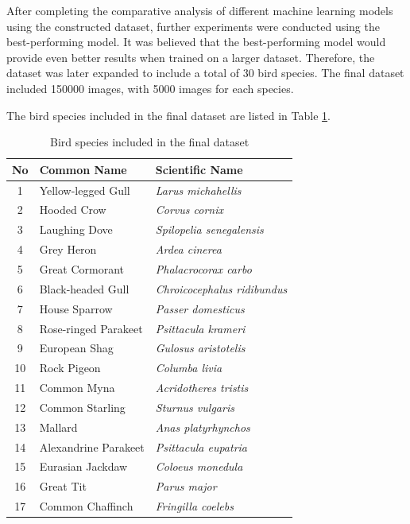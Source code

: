 After completing the comparative analysis of different machine learning models using
the constructed dataset, further experiments were conducted using the best-performing
model. It was believed that the best-performing model would provide even better
results when trained on a larger dataset. Therefore, the dataset was later expanded
to include a total of 30 bird species. The final dataset included 150000 images,
with 5000 images for each species.

The bird species included in the final dataset are listed in Table
\ref{tab:bird_species_list}.

\begin{table}[H]
\centering
\caption{Bird species included in the final dataset}
\label{tab:bird_species_list}
\begin{tabular}{|c|l|l|}
\hline
\textbf{No} & \textbf{Common Name} & \textbf{Scientific Name} \\ \hline
1  & Yellow-legged Gull & \textit{Larus michahellis} \\ \hline
2  & Hooded Crow & \textit{Corvus cornix} \\ \hline
3  & Laughing Dove & \textit{Spilopelia senegalensis} \\ \hline
4  & Grey Heron & \textit{Ardea cinerea} \\ \hline
5  & Great Cormorant & \textit{Phalacrocorax carbo} \\ \hline
6  & Black-headed Gull & \textit{Chroicocephalus ridibundus} \\ \hline
7  & House Sparrow & \textit{Passer domesticus} \\ \hline
8  & Rose-ringed Parakeet & \textit{Psittacula krameri} \\ \hline
9  & European Shag & \textit{Gulosus aristotelis} \\ \hline
10 & Rock Pigeon & \textit{Columba livia} \\ \hline
11 & Common Myna & \textit{Acridotheres tristis} \\ \hline
12 & Common Starling & \textit{Sturnus vulgaris} \\ \hline
13 & Mallard & \textit{Anas platyrhynchos} \\ \hline
14 & Alexandrine Parakeet & \textit{Psittacula eupatria} \\ \hline
15 & Eurasian Jackdaw & \textit{Coloeus monedula} \\ \hline
16 & Great Tit & \textit{Parus major} \\ \hline
17 & Common Chaffinch & \textit{Fringilla coelebs} \\ \hline

\end{tabular}
\end{table}
